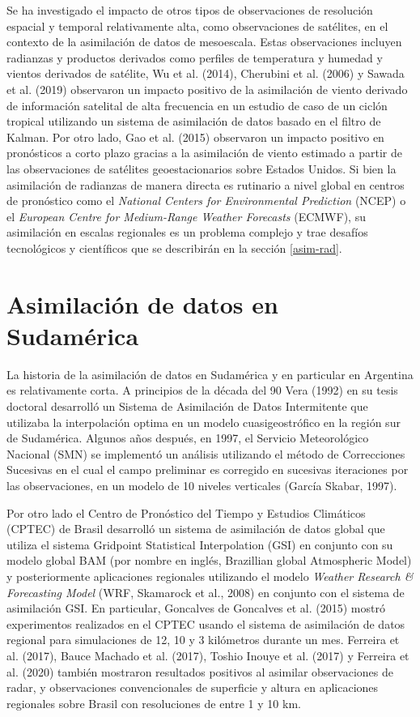 \documentclass[12pt,oneside,a4paper]{reedthesis}
\begin{document}
Se ha investigado el impacto de otros tipos de observaciones de resolución espacial y temporal relativamente alta, como observaciones de satélites, en el contexto de la asimilación de datos de mesoescala. Estas observaciones incluyen radianzas y productos derivados como perfiles de temperatura y humedad y vientos derivados de satélite, Wu et al. (2014), Cherubini et al. (2006) y Sawada et al. (2019) observaron un impacto positivo de la asimilación de viento derivado de información satelital de alta frecuencia en un estudio de caso de un ciclón tropical utilizando un sistema de asimilación de datos basado en el filtro de Kalman. Por otro lado, Gao et al. (2015) observaron un impacto positivo en pronósticos a corto plazo gracias a la asimilación de viento estimado a partir de las observaciones de satélites geoestacionarios sobre Estados Unidos. Si bien la asimilación de radianzas de manera directa es rutinario a nivel global en centros de pronóstico como el \emph{National Centers for Environmental Prediction} (NCEP) o el \emph{European Centre for Medium-Range Weather Forecasts} (ECMWF), su asimilación en escalas regionales es un problema complejo y trae desafíos tecnológicos y científicos que se describirán en la sección \ref{asim-rad}.

\hypertarget{asimilaciuxf3n-de-datos-en-sudamuxe9rica}{%
\section{Asimilación de datos en Sudamérica}\label{asimilaciuxf3n-de-datos-en-sudamuxe9rica}}

La historia de la asimilación de datos en Sudamérica y en particular en Argentina es relativamente corta. A principios de la década del 90 Vera (1992) en su tesis doctoral desarrolló un Sistema de Asimilación de Datos Intermitente que utilizaba la interpolación optima en un modelo cuasigeostrófico en la región sur de Sudamérica. Algunos años después, en 1997, el Servicio Meteorológico Nacional (SMN) se implementó un
análisis utilizando el método de Correcciones Sucesivas en el cual el campo preliminar
es corregido en sucesivas iteraciones por las observaciones, en un modelo de 10 niveles verticales (García Skabar, 1997).

Por otro lado el Centro de Pronóstico del Tiempo y Estudios Climáticos (CPTEC) de Brasil desarrolló un sistema de asimilación de datos global que utiliza el sistema Gridpoint Statistical Interpolation (GSI) en conjunto con su modelo global BAM (por nombre en inglés, Brazillian global Atmospheric Model) y posteriormente aplicaciones regionales utilizando el modelo \emph{Weather Research \& Forecasting Model} (WRF, Skamarock et al., 2008) en conjunto con el sistema de asimilación GSI. En particular, Goncalves de Goncalves et al. (2015) mostró experimentos realizados en el CPTEC usando el sistema de asimilación de datos regional para simulaciones de 12, 10 y 3 kilómetros durante un mes. Ferreira et al. (2017), Bauce Machado et al. (2017), Toshio Inouye et al. (2017) y Ferreira et al. (2020) también mostraron resultados positivos al asimilar observaciones de radar, y observaciones convencionales de superficie y altura en aplicaciones regionales sobre Brasil con resoluciones de entre 1 y 10 km.
\end{document}
